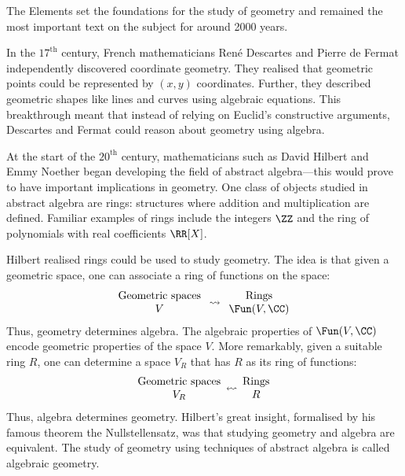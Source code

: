 \documentclass[12pt]{amsart}
\theoremstyle{plain}
\theoremstyle{definition}
\begin{document}
\noindent
The Elements set the foundations for the study of geometry and remained the most important text on the subject for around 2000 years.

In the $17^\text{th}$ century, French mathematicians Ren\'{e} Descartes and Pierre de Fermat independently discovered coordinate geometry.
They realised that geometric points could be represented by $(x, y)$ coordinates.
Further, they described geometric shapes like lines and curves using algebraic equations.
This breakthrough meant that instead of relying on Euclid's constructive arguments, Descartes and Fermat could reason about geometry using algebra.

At the start of the $20^\text{th}$ century, mathematicians such as David Hilbert and Emmy Noether began developing the field of abstract algebra---this would prove to have important implications in geometry.
One class of objects studied in abstract algebra are rings: structures where addition and multiplication are defined.
Familiar examples of rings include the integers $\ZZ$ and the ring of polynomials with real coefficients $\RR[X]$.

Hilbert realised rings could be used to study geometry.
The idea is that given a geometric space, one can associate a ring of functions on the space:
\begin{align*}
\begin{array}{c}
	\text{Geometric spaces} \\
	V
\end{array}
\rightsquigarrow
\begin{array}{c}
	\text{Rings} \\
	\Fun(V, \CC)
\end{array}
\end{align*}
Thus, geometry determines algebra.
The algebraic properties of $\Fun(V, \CC)$ encode geometric properties of the space $V$.
More remarkably, given a suitable ring $R$, one can determine a space $V_R$ that has $R$ as its ring of functions:
\begin{align*}
\begin{array}{c}
	\text{Geometric spaces} \\
	 V_R
\end{array}
\scalebox{-1}[1]{$\rightsquigarrow$}
\begin{array}{c}
	\text{Rings} \\
	R
\end{array}
\end{align*}
Thus, algebra determines geometry.
Hilbert's great insight, formalised by his famous theorem the Nullstellensatz, was that studying geometry and algebra are equivalent.
The study of geometry using techniques of abstract algebra is called algebraic geometry.
\end{document}
